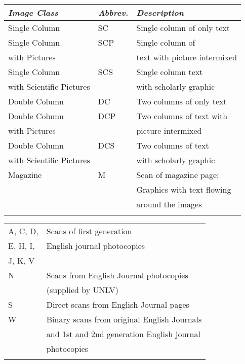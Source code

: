 \documentclass[conference]{IEEEtran}
\begin{document}
%

\begin{small}
\begin{tabular}{|l|l|l|}
\hline
{\it \bf Image Class} & {\it \bf Abbrev.} & {\it \bf Description} \\ \hline
    Single Column & SC & Single column of only text \\ \hline
    Single Column & SCP & Single column of \\
    with Pictures &     & text with picture intermixed \\ \hline
    Single Column & SCS & Single column text \\
    with Scientific Pictures &     & with scholarly graphic   \\ \hline
    Double Column & DC & Two columns of only text \\  \hline
    Double Column & DCP & Two columns of text with \\ 
    with Pictures &     & picture intermixed \\  \hline
    Double Column  & DCS & Two columns of text \\
    with Scientific Pictures &     &  with scholarly graphic  \\ \hline
    Magazine & M & Scan of magazine page; \\
             &   & Graphics with text flowing \\
             &   & around the images \\
\hline
\label{table:Winder Image Classes}
\end{tabular}
\end{small}

\begin{tabular}{|l|l|}
\hline
    A, C, D,   & Scans of first generation  \\
    E, H, I,   & English journal photocopies \\ 
    J, K, V    & \\ \hline
    N & Scans from English Journal photocopies \\ 
      & (supplied by UNLV) \\ \hline
    S & Direct scans from English Journal pages \\ \hline
    W & Binary scans from original English Journals \\
      & and 1st and 2nd generation English journal \\
      & photocopies \\ \hline
\hline
\label{table:UW-III Image Classes}
\end{tabular}
\end{document}
